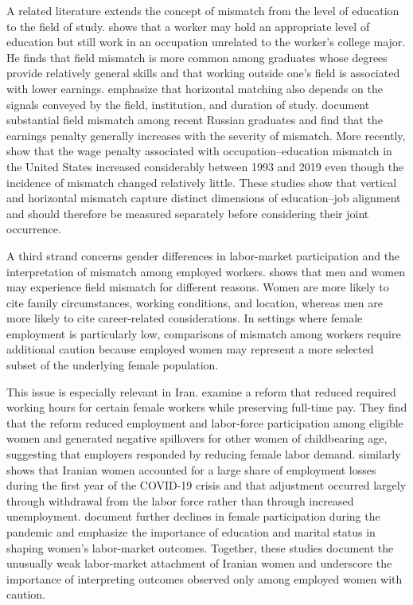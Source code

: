 A related literature extends the concept of mismatch from the level of education to the field of study. \citet{robst2007major} shows that a worker may hold an appropriate level of education but still work in an occupation unrelated to the worker's college major. He finds that field mismatch is more common among graduates whose degrees provide relatively general skills and that working outside one's field is associated with lower earnings. \citet{domadenik2013} emphasize that horizontal matching also depends on the signals conveyed by the field, institution, and duration of study. \citet{rudakov2019} document substantial field mismatch among recent Russian graduates and find that the earnings penalty generally increases with the severity of mismatch. More recently, \citet{cassidy2023} show that the wage penalty associated with occupation--education mismatch in the United States increased considerably between 1993 and 2019 even though the incidence of mismatch changed relatively little. These studies show that vertical and horizontal mismatch capture distinct dimensions of education--job alignment and should therefore be measured separately before considering their joint occurrence.

A third strand concerns gender differences in labor-market participation and the interpretation of mismatch among employed workers. \citet{robst2007gender} shows that men and women may experience field mismatch for different reasons. Women are more likely to cite family circumstances, working conditions, and location, whereas men are more likely to cite career-related considerations. In settings where female employment is particularly low, comparisons of mismatch among workers require additional caution because employed women may represent a more selected subset of the underlying female population.

This issue is especially relevant in Iran. \citet{chen2023} examine a reform that reduced required working hours for certain female workers while preserving full-time pay. They find that the reform reduced employment and labor-force participation among eligible women and generated negative spillovers for other women of childbearing age, suggesting that employers responded by reducing female labor demand. \citet{redaelli2024} similarly shows that Iranian women accounted for a large share of employment losses during the first year of the COVID-19 crisis and that adjustment occurred largely through withdrawal from the labor force rather than through increased unemployment. \citet{dang2024} document further declines in female participation during the pandemic and emphasize the importance of education and marital status in shaping women's labor-market outcomes. Together, these studies document the unusually weak labor-market attachment of Iranian women and underscore the importance of interpreting outcomes observed only among employed women with caution.

